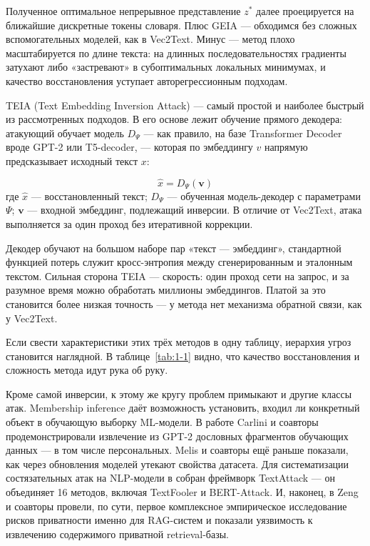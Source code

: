 \documentclass[a4paper, 12pt, oneside, openany]{article}
\begin{document}
Полученное оптимальное непрерывное представление $z^*$ далее проецируется на ближайшие дискретные токены словаря. Плюс GEIA — обходимся без сложных вспомогательных моделей, как в Vec2Text. Минус — метод плохо масштабируется по длине текста: на длинных последовательностях градиенты затухают либо «застревают» в субоптимальных локальных минимумах, и качество восстановления уступает авторегрессионным подходам.

TEIA (Text Embedding Inversion Attack) \cite{ref8} — самый простой и наиболее быстрый из рассмотренных подходов. В его основе лежит обучение прямого декодера: атакующий обучает модель $D_\Psi$ — как правило, на базе Transformer Decoder вроде GPT-2 или T5-decoder, — которая по эмбеддингу $v$ напрямую предсказывает исходный текст $x$:

\begin{equation}
	\hat{x} = D_{\Psi}(\mathbf{v})
	\label{eq:1-8}
\end{equation}
где $\hat{x}$ --- восстановленный текст; $D_{\Psi}$ --- обученная модель-декодер с параметрами $\Psi$; $\mathbf{v}$ --- входной эмбеддинг, подлежащий инверсии. В отличие от Vec2Text, атака выполняется за один проход без итеративной коррекции.

Декодер обучают на большом наборе пар «текст — эмбеддинг», стандартной функцией потерь служит кросс-энтропия между сгенерированным и эталонным текстом. Сильная сторона TEIA — скорость: один проход сети на запрос, и за разумное время можно обработать миллионы эмбеддингов. Платой за это становится более низкая точность — у метода нет механизма обратной связи, как у Vec2Text.

Если свести характеристики этих трёх методов в одну таблицу, иерархия угроз становится наглядной. В таблице~\ref{tab:1-1} видно, что качество восстановления и сложность метода идут рука об руку.

Кроме самой инверсии, к этому же кругу проблем примыкают и другие классы атак. Membership inference \cite{ref40} даёт возможность установить, входил ли конкретный объект в обучающую выборку ML-модели. В работе \cite{ref41} Carlini и соавторы продемонстрировали извлечение из GPT-2 дословных фрагментов обучающих данных — в том числе персональных. Melis и соавторы \cite{ref43} ещё раньше показали, как через обновления моделей утекают свойства датасета. Для систематизации состязательных атак на NLP-модели в \cite{ref44} собран фреймворк TextAttack — он объединяет 16 методов, включая TextFooler и BERT-Attack. И, наконец, в \cite{ref45} Zeng и соавторы провели, по сути, первое комплексное эмпирическое исследование рисков приватности именно для RAG-систем и показали уязвимость к извлечению содержимого приватной retrieval-базы.
\end{document}
